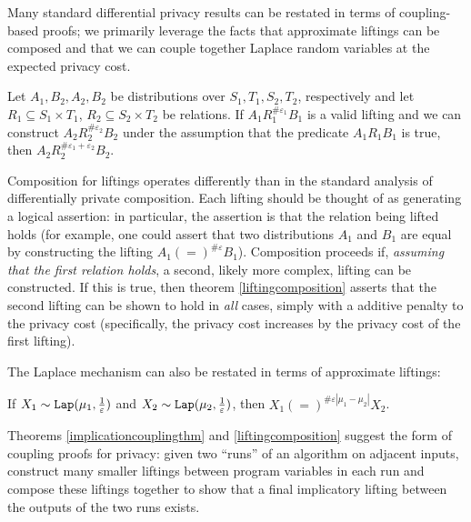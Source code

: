 Many standard differential privacy results can be restated in terms of coupling-based proofs; we primarily leverage the facts that approximate liftings can be composed and that we can couple together Laplace random variables at the expected privacy cost. 

\begin{thm}\label{liftingcomposition}
    Let $A_1, B_2, A_2, B_2$ be distributions over $S_1, T_1, S_2, T_2$, respectively and let $R_1\subseteq S_1\times T_1$, $R_2\subseteq S_2\times T_2$ be relations. If $A_1 R_1^{\#\varepsilon_1}B_1$ is a valid lifting and we can construct $A_2R_2^{\#\varepsilon_2}B_2$ under the assumption that the predicate $A_1 R_1 B_1$ is true, then $A_2 R_2^{\#\varepsilon_1+\varepsilon_2}B_2$.
\end{thm}

Composition for liftings operates differently than in the standard analysis of differentially private composition. Each lifting should be thought of as generating a logical assertion: in particular, the assertion is that the relation being lifted holds (for example, one could assert that two distributions $A_1$ and $B_1$ are equal by constructing the lifting $A_1 (=)^{\#\varepsilon}B_1$). 
Composition proceeds if, \textit{assuming that the first relation holds}, a second, likely more complex, lifting can be constructed. If this is true, then theorem \ref{liftingcomposition} asserts that the second lifting can be shown to hold in \textit{all} cases, simply with a additive penalty to the privacy cost (specifically, the privacy cost increases by the privacy cost of the first lifting). 


The Laplace mechanism can also be restated in terms of approximate liftings: 
\begin{prop}
    If $X_1\sim\texttt{Lap}(\mu_1, \frac{1}{\varepsilon})$ and $X_2\sim\texttt{Lap}(\mu_2, \frac{1}{\varepsilon})$, then $X_1(=)^{\#\varepsilon|\mu_1-\mu_2|}X_2$.
\end{prop}


Theorems \ref{implicationcouplingthm} and \ref{liftingcomposition} suggest the form of coupling proofs for privacy: given two ``runs'' of an algorithm on adjacent inputs, construct many smaller liftings between program variables in each run and compose these liftings together to show that a final implicatory lifting between the outputs of the two runs exists. 

